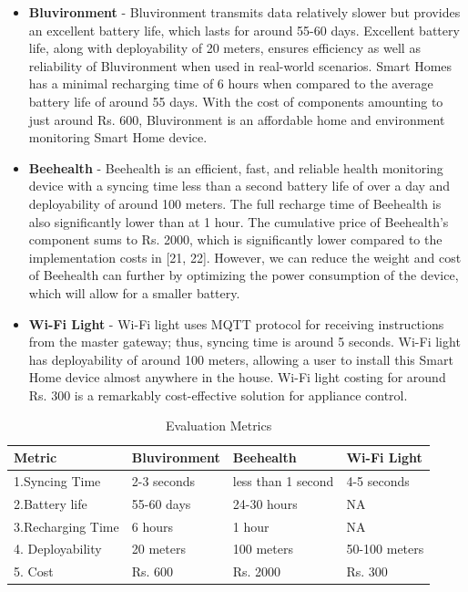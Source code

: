 \begin{itemize}
    
\item \textbf{Bluvironment} - Bluvironment transmits data relatively slower but provides an excellent battery life, which lasts for around 55-60 days. Excellent battery life, along with deployability of 20 meters, ensures efficiency as well as reliability of Bluvironment when used in real-world scenarios. Smart Homes has a minimal recharging time of 6 hours when compared to the average battery life of around 55 days. With the cost of components amounting to just around Rs. 600, Bluvironment is an affordable home and environment monitoring Smart Home device.

\item \textbf{Beehealth} - Beehealth is an efficient, fast, and reliable health monitoring device with a syncing time less than a second battery life of over a day and deployability of around 100 meters. The full recharge time of Beehealth is also significantly lower than at 1 hour.
The cumulative price of Beehealth’s component sums to Rs. 2000, which is significantly lower compared to the implementation costs in [21, 22]. However, we can reduce the weight and cost of Beehealth can further by optimizing the power consumption of the device, which will allow for a smaller battery.

\item \textbf{Wi-Fi Light} - Wi-Fi light uses MQTT protocol for receiving instructions from the master gateway; thus, syncing time is around 5 seconds. Wi-Fi light has deployability of around 100 meters, allowing a user to install this Smart Home device almost anywhere in the house. Wi-Fi light costing for around Rs. 300 is a remarkably cost-effective solution for appliance control.

\end{itemize}

\begin{table}[H]  
\caption{Evaluation Metrics}
\begin{tabular}{ | m{3cm} | m{2cm}| m{2cm} | m{2cm} | }
\hline
\textbf{Metric} & \textbf{Bluvironment} & \textbf{Beehealth} & \textbf{Wi-Fi Light} \\
\hline    
 1.Syncing Time & 2-3 seconds & less than 1 second & 4-5 seconds \\ 
 \hline
 
2.Battery life & 55-60 days & 24-30 hours & NA \\
  \hline

3.Recharging Time & 6 hours & 1 hour & NA \\
  \hline 

4. Deployability & 20 meters & 100 meters & 50-100 meters \\
\hline

5. Cost & Rs. 600 & Rs. 2000 & Rs. 300 \\
\hline

\end{tabular}
\end{table}



